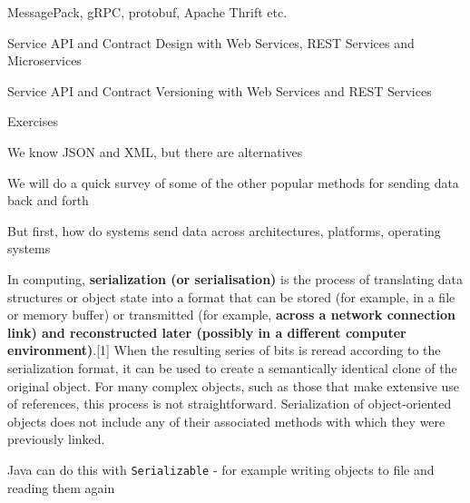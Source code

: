 \documentclass[Screen16to9,17pt]{foils}
\begin{document}

\begin{list2}
\item MessagePack, gRPC, protobuf, Apache Thrift etc.
\item Service API and Contract Design with Web Services, REST Services and Microservices
\item Service API and Contract Versioning with Web Services and REST Services
\end{list2}

Exercises
\begin{list2}
\item
\end{list2}




\begin{list2}
\item We know JSON and XML, but there are alternatives
\item We will do a quick survey of some of the other popular methods for sending data back and forth
\item But first, how do systems send data across architectures, platforms, operating systems
\end{list2}


\begin{quote}

\end{quote}
In computing, {\bf serialization (or serialisation)} is the process of translating data structures or object state into a format that can be stored (for example, in a file or memory buffer) or transmitted (for example, {\bf across a network connection link) and reconstructed later (possibly in a different computer environment)}.[1] When the resulting series of bits is reread according to the serialization format, it can be used to create a semantically identical clone of the original object. For many complex objects, such as those that make extensive use of references, this process is not straightforward. Serialization of object-oriented objects does not include any of their associated methods with which they were previously linked.
\begin{list2}
\item Java can do this with \verb+Serializable+ - for example writing objects to file and reading them again
\end{list2}
\end{document}
